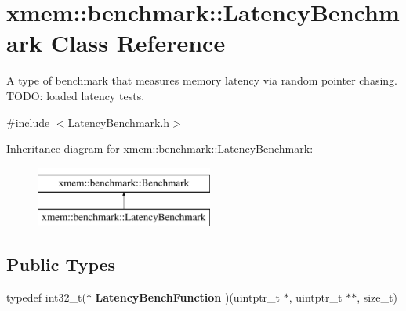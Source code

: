 \hypertarget{classxmem_1_1benchmark_1_1_latency_benchmark}{\section{xmem\-:\-:benchmark\-:\-:Latency\-Benchmark Class Reference}
\label{classxmem_1_1benchmark_1_1_latency_benchmark}
}


A type of benchmark that measures memory latency via random pointer chasing. T\-O\-D\-O\-: loaded latency tests.  




{\ttfamily \#include $<$Latency\-Benchmark.\-h$>$}

Inheritance diagram for xmem\-:\-:benchmark\-:\-:Latency\-Benchmark\-:\begin{figure}[H]
\begin{center}
\leavevmode
\includegraphics[height=2.000000cm]{classxmem_1_1benchmark_1_1_latency_benchmark}
\end{center}
\end{figure}
\subsection*{Public Types}
\begin{DoxyCompactItemize}
\item 
\hypertarget{classxmem_1_1benchmark_1_1_latency_benchmark_ae4df565b90bf168e9492cd859d104388}{typedef int32\-\_\-t($\ast$ {\bfseries Latency\-Bench\-Function} )(uintptr\-\_\-t $\ast$, uintptr\-\_\-t $\ast$$\ast$, size\-\_\-t)}\label{classxmem_1_1benchmark_1_1_latency_benchmark_ae4df565b90bf168e9492cd859d104388}

\end{DoxyCompactItemize}
